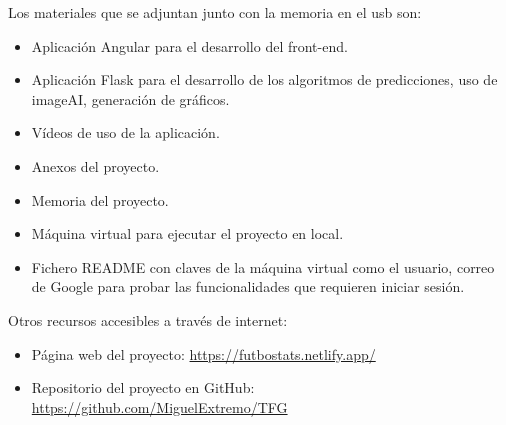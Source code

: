 Los materiales que se adjuntan junto con la memoria en el usb son:

\begin{itemize}
    \item Aplicación Angular para el desarrollo del front-end.
    \item Aplicación Flask para el desarrollo de los algoritmos de predicciones, uso de imageAI, generación de gráficos.
    \item Vídeos de uso de la aplicación.
    \item Anexos del proyecto.
    \item Memoria del proyecto.
    \item Máquina virtual para ejecutar el proyecto en local.
    \item Fichero README con claves de la máquina virtual como el usuario, correo de Google para probar las funcionalidades que requieren iniciar sesión.
\end{itemize}

Otros recursos accesibles a través de internet:

\begin{itemize}
    \item Página web del proyecto: \href{https://futbostats.netlify.app/}{https://futbostats.netlify.app/}
    \item Repositorio del proyecto en GitHub: \href{https://github.com/MiguelExtremo/TFG}{https://github.com/MiguelExtremo/TFG} 
\end{itemize}
